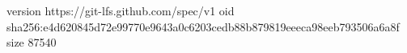 version https://git-lfs.github.com/spec/v1
oid sha256:e4d620845d72e99770e9643a0c6203cedb88b879819eeeca98eeb793506a6a8f
size 87540
